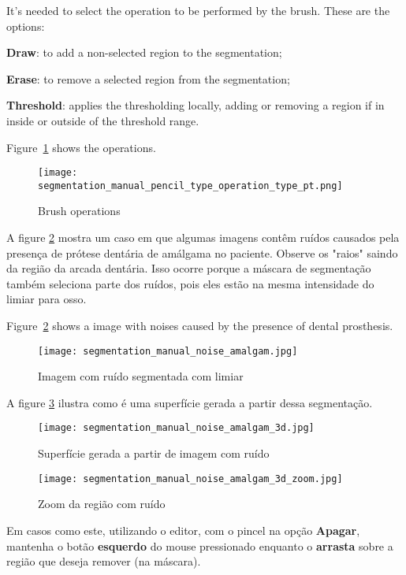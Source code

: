 It's needed to select the operation to be performed by the brush. These are the options:

\textbf{Draw}: to add a non-selected region to the segmentation;

\textbf{Erase}: to remove a selected region from the segmentation;

\textbf{Threshold}: applies the thresholding locally, adding or removing a
region if in inside or outside of the threshold range.

Figure~\ref{fig:select_brush_operations} shows the operations.

\begin{figure}[!htb]
\centering
\texttt{[image: segmentation\_manual\_pencil\_type\_operation\_type\_pt.png]}
\caption{Brush operations}
\label{fig:select_brush_operations}
\end{figure}

A figure \ref{fig:noise_amalgaman} mostra um caso em que algumas imagens contêm ruídos causados pela presença de prótese dentária de amálgama no paciente. Observe os "raios" saindo da região da arcada dentária. Isso ocorre porque a máscara de segmentação também seleciona parte dos ruídos, pois eles estão na mesma intensidade do limiar para osso.

Figure~\ref{fig:noise_amalgaman} shows a image with noises caused by the presence of dental prosthesis.

\begin{figure}[!htb]
\centering
\texttt{[image: segmentation\_manual\_noise\_amalgam.jpg]}
\caption{Imagem com ruído segmentada com limiar}
\label{fig:noise_amalgaman}
\end{figure}

A figure \ref{fig:surface_amagaman} ilustra como é uma superfície gerada a partir dessa
segmentação.

\begin{figure}[!htb]
\centering
\texttt{[image: segmentation\_manual\_noise\_amalgam\_3d.jpg]}
\caption{Superfície gerada a partir de imagem com ruído}
\label{fig:surface_amagaman}
\end{figure}

\begin{figure}[!htb]
\centering
\texttt{[image: segmentation\_manual\_noise\_amalgam\_3d\_zoom.jpg]}
\caption{Zoom da região com ruído}
\label{fig:surface_amagaman_zoom}
\end{figure}

\newpage

Em casos como este, utilizando o editor, com o pincel na opção \textbf{Apagar}, mantenha o
botão \textbf{esquerdo} do mouse pressionado enquanto o \textbf{arrasta} sobre a região que
deseja remover (na máscara).

